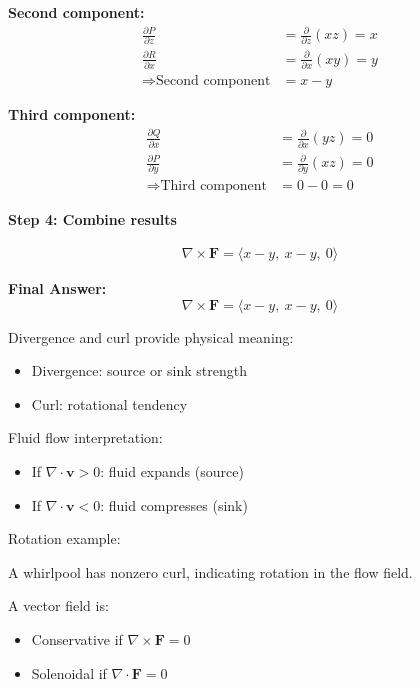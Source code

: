 \begin{examplebox}
    \textbf{Second component:}
    \begin{align*}
        \frac{\partial P}{\partial z}       & = \frac{\partial}{\partial z}(xz) = x \\
        \frac{\partial R}{\partial x}       & = \frac{\partial}{\partial x}(xy) = y \\
        \Rightarrow \text{Second component} & = x - y
    \end{align*}

    \textbf{Third component:}
    \begin{align*}
        \frac{\partial Q}{\partial x}      & = \frac{\partial}{\partial x}(yz) = 0 \\
        \frac{\partial P}{\partial y}      & = \frac{\partial}{\partial y}(xz) = 0 \\
        \Rightarrow \text{Third component} & = 0 - 0 = 0
    \end{align*}

    \textbf{Step 4: Combine results}

    \begin{align*}
        \nabla \times \mathbf{F} = \langle x - y,\ x - y,\ 0 \rangle
    \end{align*}

    \textbf{Final Answer:}
    \begin{equation*}
        \nabla \times \mathbf{F} = \langle x - y,\ x - y,\ 0 \rangle
    \end{equation*}

\end{examplebox}
\begin{conceptbox}
    Divergence and curl provide physical meaning:
    \begin{itemize}
        \item Divergence: source or sink strength
        \item Curl: rotational tendency
    \end{itemize}
\end{conceptbox}

\begin{examplebox}
    Fluid flow interpretation:
    \begin{itemize}
        \item If $\nabla \cdot \mathbf{v} > 0$: fluid expands (source)
        \item If $\nabla \cdot \mathbf{v} < 0$: fluid compresses (sink)
    \end{itemize}
    Rotation example:

    A whirlpool has nonzero curl, indicating rotation in the flow field.
\end{examplebox}
\begin{conceptbox}
    A vector field is:
    \begin{itemize}
        \item Conservative if $\nabla \times \mathbf{F} = 0$
        \item Solenoidal if $\nabla \cdot \mathbf{F} = 0$
    \end{itemize}
\end{conceptbox}


